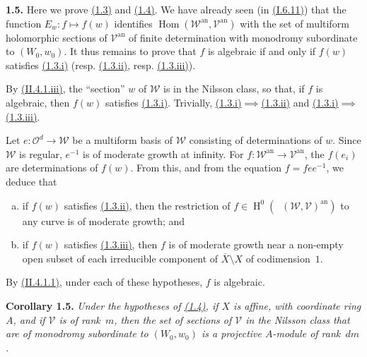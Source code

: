 \documentclass{report}
\newenvironment{itenv}[1]
  {\phantomsection\par\medskip\noindent\textbf{#1.}\itshape}
  {\par\medskip}
\newenvironment{rmenv}[1]
  {\phantomsection\par\medskip\noindent\textbf{#1.}\rmfamily}
  {\par\medskip}
\newcommand{\scr}[1]{{\mathscr{#1}}}
\renewcommand{\cal}[1]{{\mathcal{#1}}}
\newcommand{\an}{\mathrm{an}}
\DeclareMathOperator{\Hom}{Hom}
\DeclareMathOperator{\shHom}{\underline{Hom}}
\DeclareMathOperator{\HH}{H}
\newcommand{\oldpage}[1]{\marginpar{\footnotesize$\Big\vert$ \textit{p.~#1}}}
\begin{document}
\begin{rmenv}{1.5}
\label{III.1.5proof}
  Here we prove \hyperref[III.1.3]{(1.3)} and \hyperref[III.1.4]{(1.4)}.
  We have already seen (in \hyperref[I.6.11]{(I.6.11)}) that the function $E_w\colon f\mapsto f(w)$ identifies $\Hom(\scr{W}^\an,\cal{V}^\an)$ with the set of multiform holomorphic sections of $\cal{V}^\an$ of finite determination with monodromy subordinate to $(W_0,w_0)$.
  It thus remains to prove that $f$ is algebraic if and only if $f(w)$ satisfies \hyperref[III.1.3]{(1.3.i)} (resp. \hyperref[III.1.3]{(1.3.ii)}, resp. \hyperref[III.1.3]{(1.3.iii)}).

  By \hyperref[II.4.1]{(II.4.1.iii)}, the ``section'' $w$ of $\scr{W}$ is in the Nilsson class, so that, if $f$ is algebraic, then $f(w)$ satisfies \hyperref[III.1.3]{(1.3.i)}.
  Trivially, \mbox{\hyperref[III.1.3]{(1.3.i)}$\implies$\hyperref[III.1.3]{(1.3.ii)}} and \mbox{\hyperref[III.1.3]{(1.3.i)}$\implies$\hyperref[III.1.3]{(1.3.iii)}}.

  Let $e\colon\cal{O}^d\to\scr{W}$ be a multiform basis of $\scr{W}$ consisting of determinations of $w$.
  Since $\scr{W}$ is regular, $e^{-1}$ is of moderate growth at infinity.
  For $f\colon\scr{W}^\an\to\cal{V}^\an$, the $f(e_i)$ are determinations of $f(w)$.
  From this, and from the equation $f=fee^{-1}$, we deduce that
\oldpage{124}
  \begin{enumerate}[a)]
    \item if $f(w)$ satisfies \hyperref[III.1.3]{(1.3.ii)}, then the restriction of $f\in\HH^0(\shHom(\scr{W},\cal{V})^\an)$ to any curve is of moderate growth; and
    \item if $f(w)$ satisfies \hyperref[III.1.3]{(1.3.iii)}, then $f$ is of moderate growth near a non-empty open subset of each irreducible component of $\overline{X}\setminus X$ of codimension~$1$.
  \end{enumerate}
\end{rmenv}

By \hyperref[II.4.1.1]{(II.4.1.1)}, under each of these hypotheses, $f$ is algebraic.

\begin{itenv}{Corollary 1.5}
\label{III.1.5}
  Under the hypotheses of \hyperref[III.1.4]{(1.4)}, if $X$ is affine, with coordinate ring $A$, and if $\cal{V}$ is of rank~$m$, then the set of sections of $\cal{V}$ in the Nilsson class that are of monodromy subordinate to $(W_0,w_0)$ is a \emph{projective} $A$-module of rank~$dm$.
\end{itenv}
\end{document}
